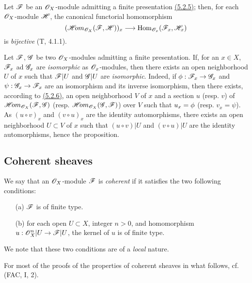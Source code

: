 \begin{env}[5.2.6]
\label{env-0.5.2.6}
Let $\mathscr{F}$ be an $\mathscr{O}_X$-module admitting a finite presentation \hyperref[env-0.5.2.5]{(5.2.5)}; then,
for each $\mathscr{O}_X$-module $\mathscr{H}$, the canonical functorial homomorphism
\[
  (\mathscr{H}\!{om}_{\mathscr{O}_X}(\mathscr{F},\mathscr{H}))_x\longrightarrow{\mathop{\mathrm{Hom}}\nolimits}_{\mathscr{O}_x}(\mathscr{F}_x,\mathscr{H}_x)
\]
is {\em bijective} (T, 4.1.1).
\end{env}

\begin{env}[5.2.7]
\label{env-0.5.2.7}
Let $\mathscr{F}$, $\mathscr{G}$ be two $\mathscr{O}_X$-modules admitting a finite presentation. If, for an
$x\in X$, $\mathscr{F}_x$ ad $\mathscr{G}_x$ are {\em isomorphic} as $\mathscr{O}_x$-modules, then there
exists an open neighborhood $U$ of $x$ such that $\mathscr{F}|U$ and $\mathscr{G}|U$ are
{\em isomorphic}. Indeed, if $\phi:\mathscr{F}_x\to\mathscr{G}_x$ and $\psi:\mathscr{G}_x\to\mathscr{F}_x$ are
an isomorphism and its inverse isomorphism, then there exists, according to
\hyperref[env-0.5.2.6]{(5.2.6)}, an open neighborhood $V$ of $x$ and a section $u$ (resp. $v$) of
$\mathscr{H}\!{om}_{\mathscr{O}_X}(\mathscr{F},\mathscr{G})$ (resp. $\mathscr{H}\!{om}_{\mathscr{O}_X}(\mathscr{G},\mathscr{F})$) over $V$ such
that $u_x=\phi$ (resp. $v_x=\psi$). As $(u\circ v)_x$ and $(v\circ u)_x$ are the identity
automorphisms, there exists an open neighborhood $U\subset V$ of $x$ such that $(u\circ v)|U$
and $(v\circ u)|U$ are the identity automorphisms, hence the proposition.
\end{env}

\subsection{Coherent sheaves}
\label{subsection-coh-sheaves}

\begin{env}[5.3.1]
\label{env-0.5.3.1}
We say that an $\mathscr{O}_X$-module $\mathscr{F}$ is {\em coherent} if it satisfies the two following
conditions:
\begin{itemize}
  \item[(a)] $\mathscr{F}$ is of finite type.
  \item[(b)] for each open $U\subset X$, integer $n>0$, and homomorphism $u:\mathscr{O}_X^n|U\to\mathscr{F}|U$,
    the kernel of $u$ is of finite type.
\end{itemize}
We note that these two conditions are of a {\em local} nature.

For most of the proofs of the properties of coherent sheaves in what follows,
cf. (FAC, I, 2).
\end{env}

